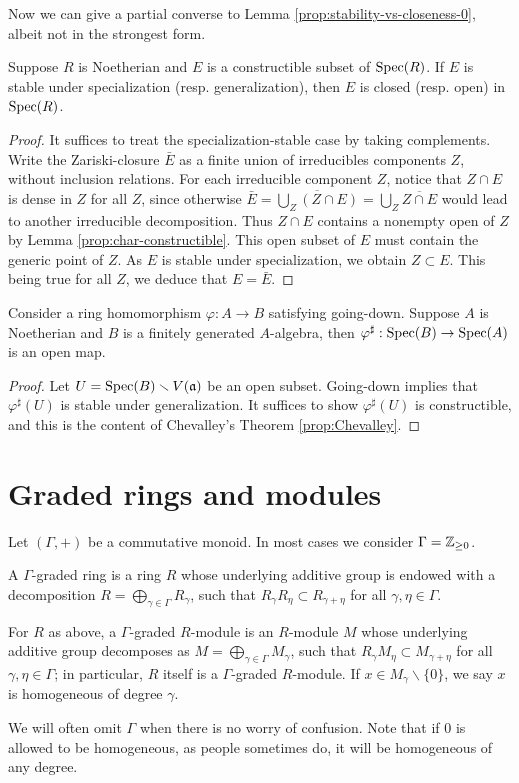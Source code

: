 Now we can give a partial converse to Lemma \ref{prop:stability-vs-closeness-0}, albeit not in the strongest form.
\begin{proposition}
	Suppose $R$ is Noetherian and $E$ is a constructible subset of $\operatorname{Spec}(R)$. If $E$ is stable under specialization (resp. generalization), then $E$ is closed (resp. open) in $\operatorname{Spec}(R)$.
\end{proposition}
\begin{proof}
	It suffices to treat the specialization-stable case by taking complements. Write the Zariski-closure $\bar{E}$ as a finite union of irreducibles components $Z$, without inclusion relations. For each irreducible component $Z$, notice that $Z \cap E$ is dense in $Z$ for all $Z$, since otherwise $\bar{E} = \overline{\bigcup_Z (Z \cap E)} = \bigcup_Z \overline{Z \cap E}$ would lead to another irreducible decomposition. Thus $Z \cap E$ contains a nonempty open of $Z$ by Lemma \ref{prop:char-constructible}. This open subset of $E$ must contain the generic point of $Z$. As $E$ is stable under specialization, we obtain $Z \subset E$. This being true for all $Z$, we deduce that $E = \bar{E}$.
\end{proof}

\begin{proposition}
	Consider a ring homomorphism $\varphi: A \to B$ satisfying going-down. Suppose $A$ is Noetherian and $B$ is a finitely generated $A$-algebra, then $\varphi^\sharp: \operatorname{Spec}(B) \to \operatorname{Spec}(A)$ is an open map.
\end{proposition}
\begin{proof}
	Let $U = \operatorname{Spec}(B) \smallsetminus V(\mathfrak{a})$ be an open subset. Going-down implies that $\varphi^\sharp(U)$ is stable under generalization. It suffices to show $\varphi^\sharp(U)$ is constructible, and this is the content of Chevalley's Theorem \ref{prop:Chevalley}.
\end{proof}

\section{Graded rings and modules}
Let $(\Gamma, +)$ be a commutative monoid. In most cases we consider $\Gamma = \mathbb{Z}_{\geq 0}$.

\begin{definition}
	A $\Gamma$-graded ring is a ring $R$ whose underlying additive group is endowed with a decomposition $R = \bigoplus_{\gamma \in \Gamma} R_\gamma$, such that $R_\gamma R_\eta \subset R_{\gamma + \eta}$ for all $\gamma, \eta \in \Gamma$.
	
	For $R$ as above, a $\Gamma$-graded $R$-module is an $R$-module $M$ whose underlying additive group decomposes as $M = \bigoplus_{\gamma \in \Gamma} M_\gamma$, such that $R_\gamma M_\eta \subset M_{\gamma + \eta}$ for all $\gamma, \eta \in \Gamma$; in particular, $R$ itself is a $\Gamma$-graded $R$-module. If $x \in M_\gamma \smallsetminus \{0\}$, we say $x$ is homogeneous of degree $\gamma$.
\end{definition}
We will often omit $\Gamma$ when there is no worry of confusion. Note that if $0$ is allowed to be homogeneous, as people sometimes do, it will be homogeneous of any degree.

